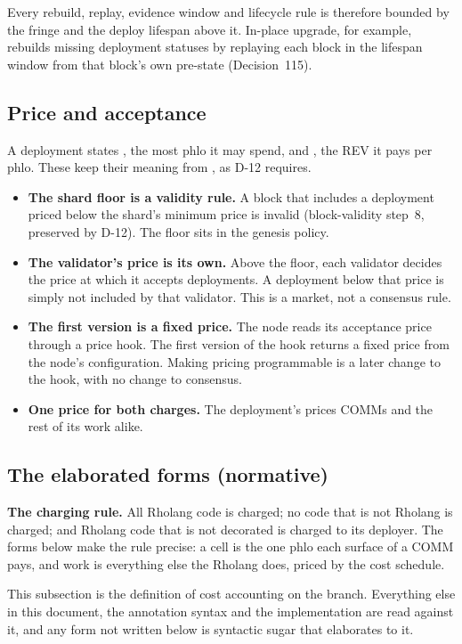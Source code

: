 \documentclass[11pt]{article}
\newcommand{\code}{\path}
\begin{document}
Every rebuild, replay, evidence window and lifecycle rule is therefore bounded by the fringe and the deploy lifespan above it. In-place upgrade, for example, rebuilds missing deployment statuses by replaying each block in the lifespan window from that block's own pre-state (Decision~115).

\subsection{Price and acceptance}

A deployment states \code{phloLimit}, the most phlo it may spend, and \code{phloPrice}, the REV it pays per phlo. These keep their meaning from \code{dev}, as D-12 requires.
\begin{itemize}
\item \textbf{The shard floor is a validity rule.} A block that includes a deployment priced below the shard's minimum price is invalid (block-validity step~8, preserved by D-12). The floor sits in the genesis policy.
\item \textbf{The validator's price is its own.} Above the floor, each validator decides the price at which it accepts deployments. A deployment below that price is simply not included by that validator. This is a market, not a consensus rule.
\item \textbf{The first version is a fixed price.} The node reads its acceptance price through a price hook. The first version of the hook returns a fixed price from the node's configuration. Making pricing programmable is a later change to the hook, with no change to consensus.
\item \textbf{One price for both charges.} The deployment's \code{phloPrice} prices COMMs and the rest of its work alike.
\end{itemize}

\subsection{The elaborated forms (normative)}\label{sec:elaborated}

\textbf{The charging rule.} All Rholang code is charged; no code that is not Rholang is charged; and Rholang code that is not decorated is charged to its deployer. The forms below make the rule precise: a cell is the one phlo each surface of a COMM pays, and work is everything else the Rholang does, priced by the cost schedule.

This subsection is the definition of cost accounting on the branch. Everything else in this document, the annotation syntax and the implementation are read against it, and any form not written below is syntactic sugar that elaborates to it.
\end{document}
